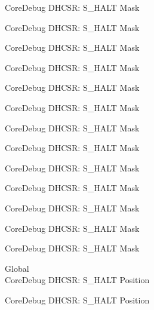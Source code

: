 \begin{DoxyRefList}
\label{deprecated__deprecated000257}%
%
Core\+Debug DHCSR\+: S\+\_\+\+HALT Mask 

\label{deprecated__deprecated000314}%
%
Core\+Debug DHCSR\+: S\+\_\+\+HALT Mask 

\label{deprecated__deprecated000390}%
%
Core\+Debug DHCSR\+: S\+\_\+\+HALT Mask 

\label{deprecated__deprecated000477}%
%
Core\+Debug DHCSR\+: S\+\_\+\+HALT Mask 

\label{deprecated__deprecated000579}%
%
Core\+Debug DHCSR\+: S\+\_\+\+HALT Mask 

\label{deprecated__deprecated000704}%
%
Core\+Debug DHCSR\+: S\+\_\+\+HALT Mask 

\label{deprecated__deprecated000796}%
%
Core\+Debug DHCSR\+: S\+\_\+\+HALT Mask 

\label{deprecated__deprecated000850}%
%
Core\+Debug DHCSR\+: S\+\_\+\+HALT Mask 

\label{deprecated__deprecated000935}%
%
Core\+Debug DHCSR\+: S\+\_\+\+HALT Mask 

\label{deprecated__deprecated000992}%
%
Core\+Debug DHCSR\+: S\+\_\+\+HALT Mask 

\label{deprecated__deprecated001068}%
%
Core\+Debug DHCSR\+: S\+\_\+\+HALT Mask 

\label{deprecated__deprecated001155}%
%
Core\+Debug DHCSR\+: S\+\_\+\+HALT Mask 

\label{deprecated__deprecated001257}%
%
Core\+Debug DHCSR\+: S\+\_\+\+HALT Mask  
\item[Global \doxylink{group___c_m_s_i_s___core_debug_ga760a9a0d7f39951dc3f07d01f1f64772}{Core\+Debug\+\_\+\+DHCSR\+\_\+\+S\+\_\+\+HALT\+\_\+\+Pos} ]\hfill \\
\label{deprecated__deprecated000025}%
%
Core\+Debug DHCSR\+: S\+\_\+\+HALT Position 

\label{deprecated__deprecated000117}%
%
Core\+Debug DHCSR\+: S\+\_\+\+HALT Position 


\end{DoxyRefList}
